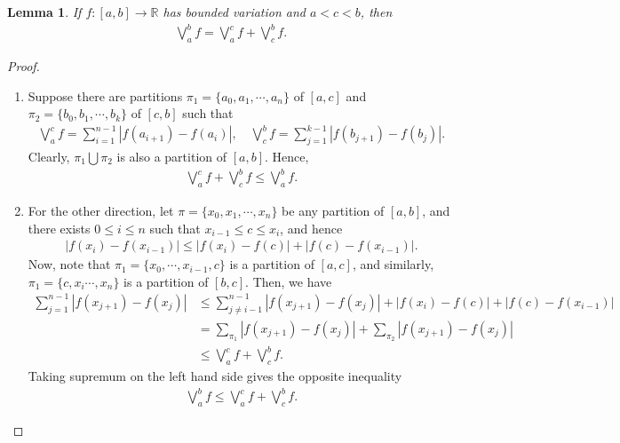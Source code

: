 \documentclass[11pt]{book}
\newtheorem{lemma}{Lemma}[chapter]
\theoremstyle{definition}
\numberwithin{equation}{chapter}
\begin{document}
\begin{lemma}\label{lemma_63}
If $f: [a,b] \to \mathbb{R}$ has bounded variation and $a < c < b$, then 
\begin{align*}
    \bigvee^b_a f = \bigvee^c_a f + \bigvee^b_c f.
\end{align*}
\end{lemma}
\begin{proof}
~\begin{enumerate}[label=(\alph*)]
    \item Suppose there are partitions $\pi_1 = \{a_0, a_1, \cdots, a_n\}$ of $[a,c]$ and $\pi_2= \{b_0, b_1, \cdots, b_k\}$ of $[c,b]$ such that
    \begin{align*}
        \bigvee^c_a f = \sum^{n-1}_{i=1} \left|f(a_{i+1}) - f(a_i)\right|, \quad \bigvee^b_c f = \sum^{k-1}_{j=1} \left|f(b_{j+1}) - f(b_j)\right|.
    \end{align*}
    Clearly, $\pi_1 \bigcup \pi_2$ is also a partition of $[a,b]$. Hence,
    \begin{align*}
        \bigvee^c_a f + \bigvee^b_c f \leq \bigvee^b_a f.
    \end{align*}
    
    \item For the other direction, let $\pi = \{x_0, x_1, \cdots, x_n\}$ be any partition of $[a,b]$, and there exists $0 \leq i \leq n$ such that $x_{i-1} \leq c \leq x_i$, and hence
    \begin{align*}
        \left|f(x_i) - f(x_{i-1})\right| \leq \left|f(x_i) - f(c)\right| + \left|f(c) - f(x_{i-1})\right|.
    \end{align*}
    Now, note that $\pi_1 = \{x_0, \cdots, x_{i-1}, c\}$ is a partition of $[a,c]$, and  similarly, $\pi_1 = \{c, x_i \cdots, x_n\}$ is a partition of $[b,c]$. Then, we have
    \begin{align*}
        \sum^{n-1}_{j=1} \left|f(x_{j+1}) - f(x_{j})\right| & \leq \sum^{n-1}_{j \neq i-1} \left|f(x_{j+1}) - f(x_{j})\right| + \left|f(x_i) - f(c)\right| + \left|f(c) - f(x_{i-1})\right| \\
        & = \sum_{\pi_1} \left|f(x_{j+1}) - f(x_{j})\right| + \sum_{\pi_2} \left|f(x_{j+1}) - f(x_{j})\right| \\
        & \leq \bigvee^c_a f + \bigvee^b_c f.
    \end{align*}
    Taking supremum on the left hand side gives the opposite inequality
    \begin{align*}
        \bigvee^b_a f \leq \bigvee^c_a f + \bigvee^b_c f.
    \end{align*}
\end{enumerate}
\end{proof}
\end{document}
